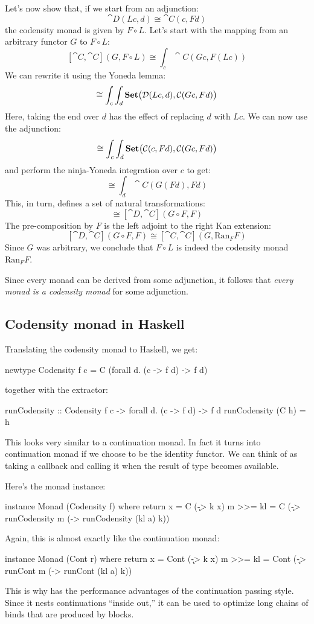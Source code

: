 \documentclass[DaoFP]{subfiles}
\begin{document}
Let's now show that, if we start from an adjunction:
\[ \cat D(L c, d) \cong \cat C (c, F d) \]
the codensity monad is given by $F \circ L$. Let's start with the mapping from an arbitrary functor $G$ to $F \circ L$:
\[ [\cat C, \cat C](G, F \circ L) \cong  \int_c \cat C (G c, F (L c)) \]
We can rewrite it using the Yoneda lemma:
\[ \cong \int_c \int_d \mathbf{Set}\big(\mathcal{D}(L c, d), \mathcal{C} (G c, F d)\big) \]
Here, taking the end over $d$ has the effect of replacing $d$ with $L c$. We can now use the adjunction:
\[ \cong \int_c \int_d \mathbf{Set}\big(\mathcal{C}(c, F d), \mathcal{C} (G c, F d)\big) \]
and perform the ninja-Yoneda integration over $c$ to get:
\[ \cong \int_d \cat C (G (F d), F d) \]
This, in turn, defines a set of natural transformations:
\[ \cong [\cat D, \cat C](G \circ F, F) \]
The pre-composition by $F$ is the left adjoint to the right Kan extension:
\[ [\cat D, \cat C](G \circ F, F) \cong  [\cat C, \cat C] (G, \text{Ran}_F F)\]
Since $G$ was arbitrary, we conclude that $F \circ L$ is indeed the codensity monad $\text{Ran}_F F$.

Since every monad can be derived from some adjunction, it follows that \emph{every monad is a codensity monad} for some adjunction.

\subsection{Codensity monad in Haskell}

Translating the codensity monad to Haskell, we get:
 \begin{haskell}
newtype Codensity f c = C (forall d. (c -> f d) -> f d)
 \end{haskell}
 together with the extractor:
 \begin{haskell}
runCodensity :: Codensity f c -> forall d. (c -> f d) -> f d
runCodensity (C h) = h
 \end{haskell}
This looks very similar to a continuation monad. In fact it turns into continuation monad if we choose  to be the identity functor. We can think of  as taking a callback  and calling it when the result of type  becomes available. 

Here's the monad instance:
 \begin{haskell}
instance Monad (Codensity f) where
  return x = C (\k -> k x)
  m >>= kl = C (\k -> runCodensity m (\a -> runCodensity (kl a) k))
 \end{haskell}
 Again, this is almost exactly like the continuation monad:
 \begin{haskell}
instance Monad (Cont r) where
  return x = Cont (\k -> k x)
  m >>= kl = Cont (\k -> runCont m (\a -> runCont (kl a) k))
\end{haskell}
This is why  has the performance advantages of the continuation passing style. Since it nests continuations ``inside out,'' it can be used to optimize long chains of binds that are produced by  blocks. 
\end{document}
